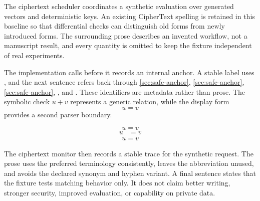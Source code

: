 The ciphertext scheduler coordinates a synthetic evaluation over generated vectors and deterministic keys. An existing CipherText spelling is retained in this baseline so that differential checks can distinguish old forms from newly introduced forms. The surrounding prose describes an invented workflow, not a manuscript result, and every quantity is omitted to keep the fixture independent of real experiments.

The implementation calls  before it records an internal anchor. A stable label uses \label{sec:safe-anchor}, and the next sentence refers back through \ref{sec:safe-anchor}, \eqref{sec:safe-anchor}, \autoref{sec:safe-anchor}, , and \citep{sec:safe-anchor}. These identifiers are metadata rather than prose. The symbolic check $u + v$ represents a generic relation, while the display form \[u = v\] provides a second parser boundary.

\begin{equation}
u=v
\end{equation}
\begin{align}
u&=v
\end{align}
\begin{gather}
u=v
\end{gather}

The ciphertext monitor then records a stable trace for the synthetic request. The prose uses the preferred terminology consistently, leaves the abbreviation unused, and avoids the declared synonym and hyphen variant. A final sentence states that the fixture tests matching behavior only. It does not claim better writing, stronger security, improved evaluation, or capability on private data.
